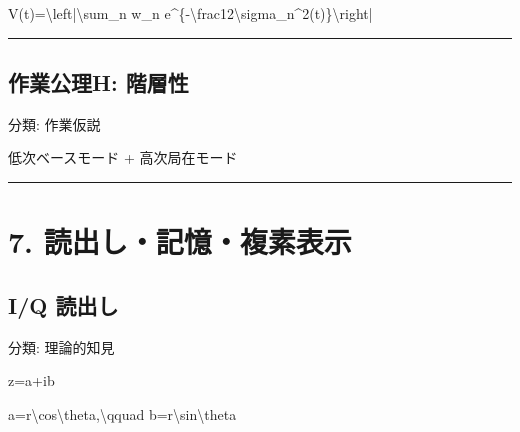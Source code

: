 \documentclass[
  a4paper]{ltjsarticle}
\newenvironment{Shaded}{}{}
\newcommand{\NormalTok}[1]{#1}
\begin{document}
\begin{Shaded}
\begin{Highlighting}[]
\NormalTok{V(t)=\textbackslash{}left|\textbackslash{}sum\_n w\_n e\^{}\{{-}\textbackslash{}frac12\textbackslash{}sigma\_n\^{}2(t)\}\textbackslash{}right|}
\end{Highlighting}
\end{Shaded}

\begin{center}\rule{0.5\linewidth}{0.5pt}\end{center}

\subsection{作業公理H:
階層性}\label{ux4f5cux696dux516cux7406h-ux968eux5c64ux6027}

分類: 作業仮説

\begin{Shaded}
\begin{Highlighting}[]
\NormalTok{低次ベースモード}
\NormalTok{+ 高次局在モード}
\end{Highlighting}
\end{Shaded}

\begin{center}\rule{0.5\linewidth}{0.5pt}\end{center}

\section{7.
読出し・記憶・複素表示}\label{ux8aadux51faux3057ux8a18ux61b6ux8907ux7d20ux8868ux793a}

\subsection{I/Q 読出し}\label{iq-ux8aadux51faux3057}

分類: 理論的知見

\begin{Shaded}
\begin{Highlighting}[]
\NormalTok{z=a+ib}
\end{Highlighting}
\end{Shaded}

\begin{Shaded}
\begin{Highlighting}[]
\NormalTok{a=r\textbackslash{}cos\textbackslash{}theta,\textbackslash{}qquad b=r\textbackslash{}sin\textbackslash{}theta}
\end{Highlighting}
\end{Shaded}
\end{document}
